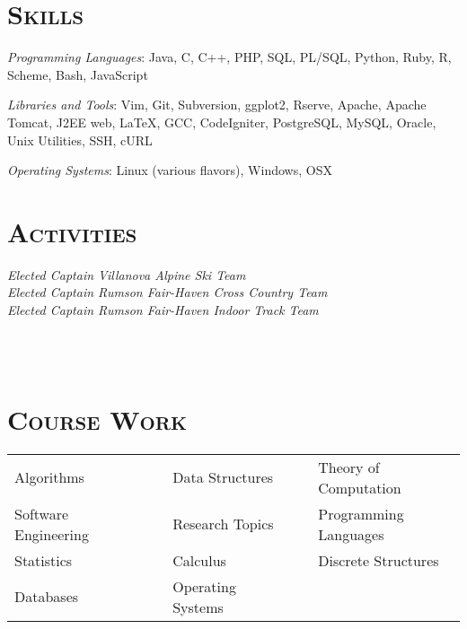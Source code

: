 \begin{resume}

\section{\textsc{Skills}}

\emph{Programming Languages}: Java, C, C++, PHP, SQL, PL/SQL, Python, Ruby, R,
Scheme, Bash, JavaScript

\emph{Libraries and Tools}: Vim, Git, Subversion, ggplot2, Rserve, Apache,
Apache Tomcat, J2EE web, LaTeX, GCC, CodeIgniter, PostgreSQL, MySQL,
Oracle, Unix Utilities, SSH, cURL

\emph{Operating Systems}: Linux (various flavors), Windows, OSX


\section{\textsc{Activities}}

\emph{Elected Captain Villanova Alpine Ski Team} \\
\emph{Elected Captain Rumson Fair-Haven Cross Country Team} \\
\emph{Elected Captain Rumson Fair-Haven Indoor Track Team} \\

\begin{formatb}
  \\
  \body\\
\end{formatb}



\section{\textsc{Course Work}}
  \begin{tabular}{lllll}

  Algorithms             & \ \ & Data Structures     & \ \ & Theory of Computation \\
  Software Engineering   & \ \ & Research Topics     & \ \ & Programming Languages \\
  Statistics             & \ \ & Calculus            & \ \ & Discrete Structures \\
  Databases              & \ \ & Operating Systems   & \ \ & 

  \end{tabular}

\end{resume}

